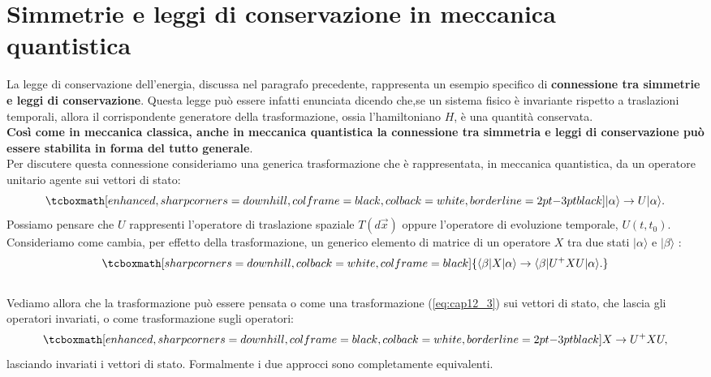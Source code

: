 \section[Simmetrie e leggi di conservazione  in meccanica quantistica]{Simmetrie e leggi di conservazione  in meccanica \\quantistica} 

La legge di conservazione dell'energia, discussa nel paragrafo precedente, rappresenta un esempio specifico di \textbf{connessione tra simmetrie e leggi di conservazione}. Questa legge può essere infatti enunciata dicendo che,se un sistema fisico è invariante rispetto a traslazioni temporali, allora il corrispondente generatore della trasformazione, ossia l'hamiltoniano $H$, è una quantità conservata.\\

\textbf{Così come in meccanica classica, anche in meccanica quantistica la connessione tra simmetria e leggi di conservazione può essere stabilita in forma del tutto generale}.\\

Per discutere questa connessione consideriamo una generica trasformazione che è rappresentata, in meccanica quantistica, da un operatore unitario agente sui vettori di stato:
	\begin{equation}
	\label{eq:cap12_3}
		\tcboxmath[enhanced, sharp corners=downhill, colframe=black, colback=white, borderline={2pt}{-3pt}{black}]{
			|\alpha \rangle \rightarrow {U}|\alpha \rangle.
			}
	\end{equation}
Possiamo pensare che ${U}$ rappresenti l'operatore di traslazione spaziale $T(d\vec{x})$ oppure l'operatore di evoluzione temporale, ${U}(t,t_0)$.\\

Consideriamo come cambia, per effetto della trasformazione, un generico elemento di matrice di un operatore ${X}$ tra due stati $|\alpha \rangle$ e $|\beta\rangle$ :
	\begin{equation}
		\tcboxmath[sharp corners=downhill, colback=white, colframe=black]{
			\langle \beta|{X}|\alpha \rangle   \rightarrow    \langle \beta |{U}^+{X}{U}|\alpha \rangle.
			}
	\end{equation}\\

Vediamo allora che la trasformazione può essere pensata o come una trasformazione (\ref{eq:cap12_3})  sui vettori di stato, che lascia gli operatori invariati, o come trasformazione sugli operatori:
	\begin{equation}
	\label{eq:cap12_4}
		\tcboxmath[enhanced, sharp corners=downhill, colframe=black, colback=white, borderline={2pt}{-3pt}{black}]{
		{X}\rightarrow {U}^+ {X}{U},}
	\end{equation}
lasciando invariati i vettori di stato. Formalmente i due approcci sono completamente equivalenti.\\

